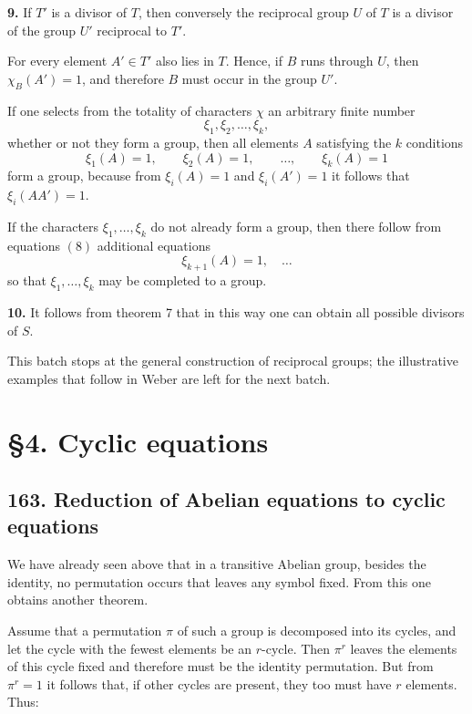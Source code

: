\documentclass[11pt,a4paper]{book}
\begin{document}
\medskip
\noindent\textbf{9.} If \(T'\) is a divisor of \(T\), then conversely the reciprocal group \(U\) of \(T\) is a divisor of the group \(U'\) reciprocal to \(T'\).

\medskip
For every element \(A'\in T'\) also lies in \(T\). Hence, if \(B\) runs through \(U\), then \(\chi_B(A')=1\), and therefore \(B\) must occur in the group \(U'\).

If one selects from the totality of characters \(\chi\) an arbitrary finite number
\[
\xi_1,\xi_2,\dots,\xi_k,
\]
whether or not they form a group, then all elements \(A\) satisfying the \(k\) conditions
\[
\xi_1(A)=1,\qquad
\xi_2(A)=1,\qquad
\dots,\qquad
\xi_k(A)=1
\tag{8}
\]
form a group, because from \(\xi_i(A)=1\) and \(\xi_i(A')=1\) it follows that \(\xi_i(AA')=1\).

If the characters \(\xi_1,\dots,\xi_k\) do not already form a group, then there follow from equations \((8)\) additional equations
\[
\xi_{k+1}(A)=1,\quad \dots
\]
so that \(\xi_1,\dots,\xi_k\) may be completed to a group.

\medskip
\noindent\textbf{10.} It follows from theorem 7 that in this way one can obtain all possible divisors of \(S\).

\medskip
\noindent This batch stops at the general construction of reciprocal groups; the illustrative examples that follow in Weber are left for the next batch.

\section*{\S 4. Cyclic equations}

\subsection*{163. Reduction of Abelian equations to cyclic equations}

We have already seen above that in a transitive Abelian group, besides the identity, no permutation occurs that leaves any symbol fixed. From this one obtains another theorem.

Assume that a permutation $\pi$ of such a group is decomposed into its cycles, and let the cycle with the fewest elements be an $r$-cycle. Then $\pi^r$ leaves the elements of this cycle fixed and therefore must be the identity permutation. But from $\pi^r = 1$ it follows that, if other cycles are present, they too must have $r$ elements. Thus:
\end{document}
